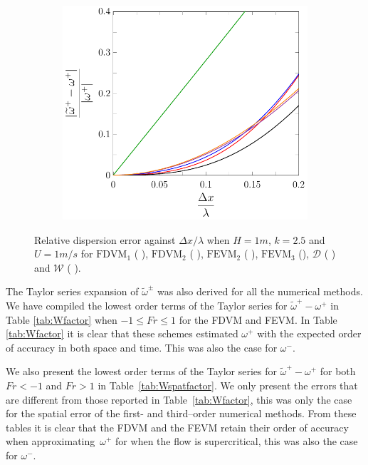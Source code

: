 \begin{figure}
\begin{subfigure}{0.5\textwidth}
	\end{subfigure}
	\par\bigskip
	\begin{subfigure}{0.5\textwidth}
		\includegraphics[width=\textwidth]{./chp4/figures/New/Dispu1Fill.pdf}
	\end{subfigure}
	\caption{Relative dispersion error against $\Delta x / \lambda$ when $H = 1m$, $k = 2.5$ and $U = 1m/s$ for $\text{FDVM}_1$ ({\color{green!60!black} \solidrule}), $\text{FDVM}_2$ ({\color{red} \solidrule}), $\text{FEVM}_2$ ({\color{blue} \solidrule}), $\text{FEVM}_3$ ({\solidrule}), $\mathcal{D}$ ({\color{violet!80!white} \solidrule}) and $\mathcal{W}$ ({\color{orange} \solidrule}).}
	\label{fig:Dispu1Fill}
\end{figure}

The Taylor series expansion of $\widetilde{\omega}^\pm$ was also derived for all the numerical methods. We have compiled the lowest order terms of the Taylor series for ${\widetilde{\omega}^+-\omega^+}$ in Table \ref{tab:Wfactor} when $ -1 \le Fr \le 1$ for the FDVM and FEVM. In Table \ref{tab:Wfactor} it is clear that these schemes estimated $\omega^+$ with the expected order of accuracy in both space and time. This was also the case for $\omega^-$.

We also present the lowest order terms of the Taylor series for ${\widetilde{\omega}^+-\omega^+}$ for both $ Fr < -1$ and $ Fr > 1$ in Table~\ref{tab:Wspatfactor}. We only present the errors that are different from those reported in Table~\ref{tab:Wfactor}, this was only the case for the spatial error of the first- and third--order numerical methods. From these tables it is clear that the FDVM and the FEVM retain their order of accuracy when approximating~$\omega^+$ for when the flow is supercritical, this was also the case for $\omega^-$. 

